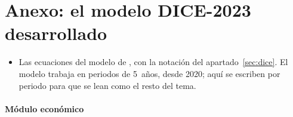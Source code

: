 \documentclass[11pt]{article}
\begin{document}
\clearpage
\appendix

\section{Anexo: el modelo DICE-2023 desarrollado}\label{anexo:dice}

\begin{itemize}
\item Las ecuaciones del modelo de \textcite{BarrageNordhaus2024DICE}, con la notación del apartado~\ref{sec:dice}. El modelo trabaja en periodos de 5~años, desde 2020; aquí se escriben por periodo para que se lean como el resto del tema.
\end{itemize}

\paragraph{Módulo económico}
\end{document}
